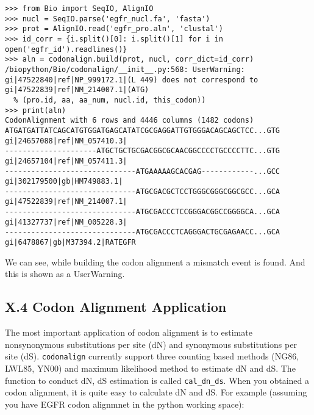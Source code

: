 \documentclass{article}
\begin{document}
\begin{verbatim}
>>> from Bio import SeqIO, AlignIO
>>> nucl = SeqIO.parse('egfr_nucl.fa', 'fasta')
>>> prot = AlignIO.read('egfr_pro.aln', 'clustal')
>>> id_corr = {i.split()[0]: i.split()[1] for i in open('egfr_id').readlines()}
>>> aln = codonalign.build(prot, nucl, corr_dict=id_corr)
/biopython/Bio/codonalign/__init__.py:568: UserWarning: gi|47522840|ref|NP_999172.1|(L 449) does not correspond to gi|47522839|ref|NM_214007.1|(ATG)
  % (pro.id, aa, aa_num, nucl.id, this_codon))
>>> print(aln)
CodonAlignment with 6 rows and 4446 columns (1482 codons)
ATGATGATTATCAGCATGTGGATGAGCATATCGCGAGGATTGTGGGACAGCAGCTCC...GTG gi|24657088|ref|NM_057410.3|
---------------------ATGCTGCTGCGACGGCGCAACGGCCCCTGCCCCTTC...GTG gi|24657104|ref|NM_057411.3|
------------------------------ATGAAAAAGCACGAG------------...GCC gi|302179500|gb|HM749883.1|
------------------------------ATGCGACGCTCCTGGGCGGGCGGCGCC...GCA gi|47522839|ref|NM_214007.1|
------------------------------ATGCGACCCTCCGGGACGGCCGGGGCA...GCA gi|41327737|ref|NM_005228.3|
------------------------------ATGCGACCCTCAGGGACTGCGAGAACC...GCA gi|6478867|gb|M37394.2|RATEGFR
\end{verbatim}

We can see, while building the codon alignment a mismatch event is
found. And this is shown as a UserWarning.

\subsection{X.4 Codon Alignment Application}

The most important application of codon alignment is to estimate
nonsynonymous substitutions per site (dN) and synonymous substitutions
per site (dS). \texttt{codonalign} currently support three counting
based methods (NG86, LWL85, YN00) and maximum likelihood method to
estimate dN and dS. The function to conduct dN, dS estimation is called
\texttt{cal\_dn\_ds}. When you obtained a codon alignment, it is quite
easy to calculate dN and dS. For example (assuming you have EGFR codon
alignmnet in the python working space):
\end{document}
